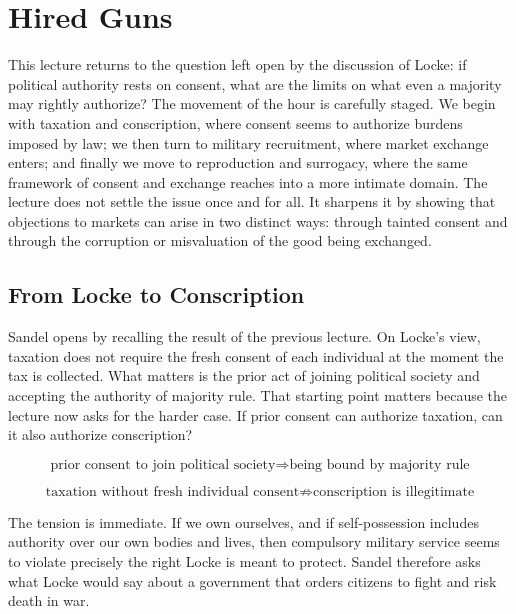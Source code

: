 \chapter{Hired Guns}

This lecture returns to the question left open by the discussion of Locke: if political authority rests on consent, what are the limits on what even a majority may rightly authorize? The movement of the hour is carefully staged. We begin with taxation and conscription, where consent seems to authorize burdens imposed by law; we then turn to military recruitment, where market exchange enters; and finally we move to reproduction and surrogacy, where the same framework of consent and exchange reaches into a more intimate domain. The lecture does not settle the issue once and for all. It sharpens it by showing that objections to markets can arise in two distinct ways: through tainted consent and through the corruption or misvaluation of the good being exchanged.

\section{From Locke to Conscription}

Sandel opens by recalling the result of the previous lecture. On Locke's view, taxation does not require the fresh consent of each individual at the moment the tax is collected. What matters is the prior act of joining political society and accepting the authority of majority rule. That starting point matters because the lecture now asks for the harder case. If prior consent can authorize taxation, can it also authorize conscription?

\begin{equation}
\text{prior consent to join political society} \Longrightarrow \text{being bound by majority rule}
\end{equation}

\begin{equation}
\text{taxation without fresh individual consent} \not\Rightarrow \text{conscription is illegitimate}
\end{equation}

The tension is immediate. If we own ourselves, and if self-possession includes authority over our own bodies and lives, then compulsory military service seems to violate precisely the right Locke is meant to protect. Sandel therefore asks what Locke would say about a government that orders citizens to fight and risk death in war.

